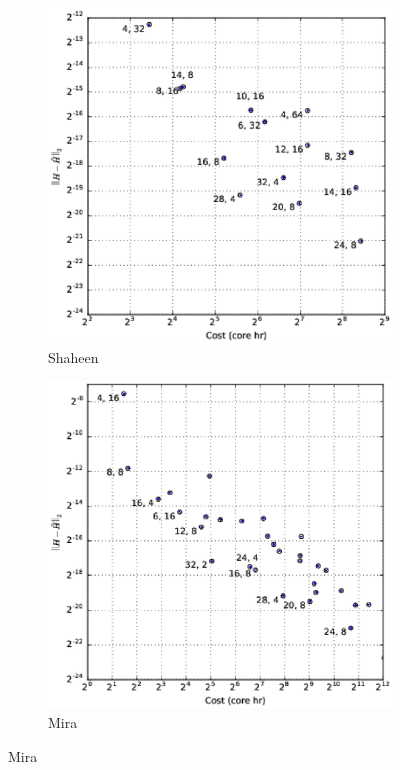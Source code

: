 \begin{figure}
\begin{subfigure}[t]{0.49\textwidth}
\includegraphics[width=\textwidth]{gfx/shaheen_H}
\caption{Shaheen}
\end{subfigure}
\begin{subfigure}[t]{0.49\textwidth}
\includegraphics[width=\textwidth]{gfx/mira_H}
\caption{Mira}
\end{subfigure}


\end{figure}
